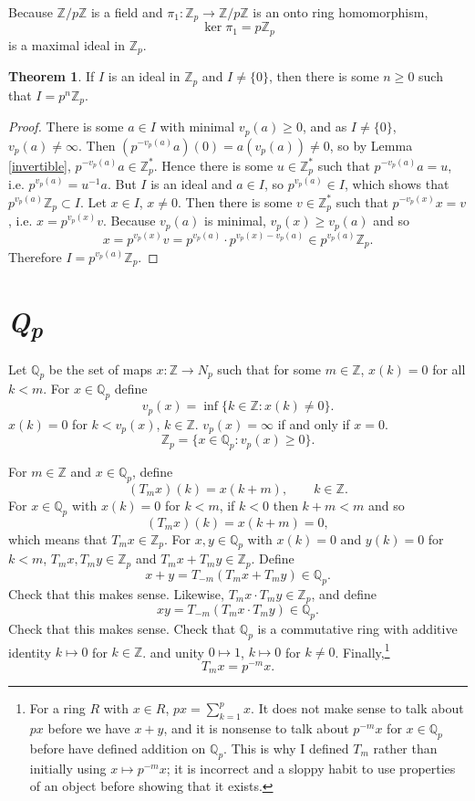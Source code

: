 \documentclass{article}
\theoremstyle{definition}
\newtheorem{theorem}{Theorem}
\theoremstyle{definition}
\begin{document}
Because $\mathbb{Z}/p\mathbb{Z}$ is a field and $\pi_1:\mathbb{Z}_p \to \mathbb{Z}/p\mathbb{Z}$ is an onto ring homomorphism,
\[
\ker \pi_1 = p\mathbb{Z}_p
\]
is a maximal ideal in $\mathbb{Z}_p$.



\begin{theorem}
If $I$ is an ideal in $\mathbb{Z}_p$ and $I \neq \{0\}$, then
there is some $n \geq 0$ such that $I=p^n \mathbb{Z}_p$.
\end{theorem}
\begin{proof}
There is some $a \in I$ with minimal $v_p(a) \geq 0$, and as $I \neq \{0\}$, $v_p(a) \neq \infty$. 
Then $(p^{-v_p(a)}a)(0) = a(v_p(a)) \neq 0$, so by Lemma \ref{invertible},
$p^{-v_p(a)} a \in \mathbb{Z}_p^*$. Hence there is some $u \in \mathbb{Z}_p^*$ such that
$p^{-v_p(a)} a = u$, i.e. $p^{v_p(a)} = u^{-1} a$. But $I$ is an ideal and $a \in I$, so
$p^{v_p(a)} \in I$, which shows that $p^{v_p(a)} \mathbb{Z}_p \subset I$. 
Let $x \in I$, $x \neq 0$.
Then there is some $v \in \mathbb{Z}_p^*$ such that $p^{-v_p(x)}x=v$, i.e.
$x = p^{v_p(x)}v$.  
Because $v_p(a)$ is minimal, $v_p(x) \geq v_p(a)$ and so
\[
x = p^{v_p(x)} v = p^{v_p(a)} \cdot p^{v_p(x)-v_p(a)} \in p^{v_p(a)} \mathbb{Z}_p.
\]
Therefore $I = p^{v_p(a)} \mathbb{Z}_p$.
\end{proof}



\section{{\em \textbf{Q}\textsubscript{p}}}
Let $\mathbb{Q}_p$ be the set of maps $x:\mathbb{Z} \to N_p$ such that for some $m \in \mathbb{Z}$, 
$x(k)=0$ for all $k<m$. For $x \in \mathbb{Q}_p$ define
\[
v_p(x) = \inf\{k \in \mathbb{Z} : x(k) \neq 0\}. 
\]
$x(k)=0$ for $k<v_p(x)$, $k \in \mathbb{Z}$. $v_p(x) = \infty$ if and only if $x=0$.
\[
\mathbb{Z}_p = \{x \in \mathbb{Q}_p: v_p(x) \geq 0\}.
\]

For $m \in \mathbb{Z}$ and $x \in \mathbb{Q}_p$, define 
\[
(T_m x)(k) = x(k+m),\qquad k \in \mathbb{Z}.
\]
For  $x \in \mathbb{Q}_p$ with $x(k)=0$ for $k<m$,
if $k<0$ then $k+m<m$ and so 
\[
(T_m x)(k) = x(k+m) = 0,
\]
which means that $T_m x \in \mathbb{Z}_p$.
For $x,y \in \mathbb{Q}_p$ with
$x(k)=0$ and $y(k)=0$ for $k<m$,
$T_m x, T_m y \in \mathbb{Z}_p$ and 
$T_m x + T_m y \in \mathbb{Z}_p$. Define
\[
x+y = T_{-m}(T_m x + T_m y) \in \mathbb{Q}_p.
\]
Check that this makes sense.
Likewise, $T_m x \cdot T_m y \in \mathbb{Z}_p$, and define
\[
xy = T_{-m} (T_m x  \cdot T_m y) \in \mathbb{Q}_p.
\]
Check that this makes sense.
Check that $\mathbb{Q}_p$ is a commutative ring with 
additive identity $k \mapsto 0$ for $k \in \mathbb{Z}$.
and unity $0 \mapsto 1$, $k \mapsto 0$ for $k \neq 0$. Finally,\footnote{For a ring $R$ with $x \in R$, $px = \sum_{k=1}^p x$. It does not make
sense to talk about $px$ before we have $x+y$, and  it is nonsense to talk about $p^{-m}x$ for $x \in \mathbb{Q}_p$ before have
defined addition on $\mathbb{Q}_p$. This is why I defined $T_m$ rather than initially using $x \mapsto p^{-m}x$; it is incorrect and a sloppy
habit to use properties of an object before showing that it exists.}
\[
T_m x = p^{-m}x.
\]
\end{document}
